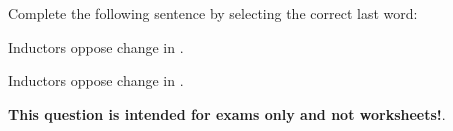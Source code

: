 

Complete the following sentence by selecting the correct last word:

\vskip 10pt {\narrower \noindent \baselineskip5pt

Inductors oppose change in .

\par} \vskip 10pt








Inductors oppose change in .







{\bf This question is intended for exams only and not worksheets!}.



